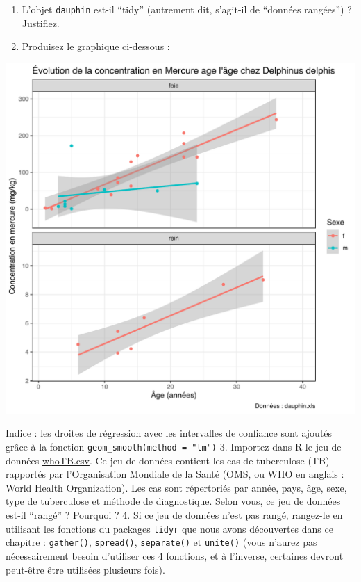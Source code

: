 \documentclass[a4paperpaper,]{article}
\providecommand{\tightlist}{%
  \setlength{\itemsep}{0pt}\setlength{\parskip}{0pt}}
\theoremstyle{definition}
\theoremstyle{definition}
\theoremstyle{definition}
\theoremstyle{remark}
\begin{document}
\begin{enumerate}
\def\labelenumi{\arabic{enumi}.}
\tightlist
\item
  L'objet \texttt{dauphin} est-il ``tidy'' (autrement dit, s'agit-il de
  ``données rangées'') ? Justifiez.
\item
  Produisez le graphique ci-dessous :
\end{enumerate}

\begin{center}\includegraphics[width=0.9\linewidth]{figure/exercicedauphin-1} \end{center}

Indice : les droites de régression avec les intervalles de confiance
sont ajoutés grâce à la fonction \texttt{geom\_smooth(method\ =\ "lm")}
3. Importez dans R le jeu de données \href{data/whoTB.csv}{whoTB.csv}.
Ce jeu de données contient les cas de tuberculose (TB) rapportés par
l'Organisation Mondiale de la Santé (OMS, ou WHO en anglais : World
Health Organization). Les cas sont répertoriés par année, pays, âge,
sexe, type de tuberculose et méthode de diagnostique. Selon vous, ce jeu
de données est-il ``rangé'' ? Pourquoi ? 4. Si ce jeu de données n'est
pas rangé, rangez-le en utilisant les fonctions du packages
\texttt{tidyr} que nous avons découvertes dans ce chapitre :
\texttt{gather()}, \texttt{spread()}, \texttt{separate()} et
\texttt{unite()} (vous n'aurez pas nécessairement besoin d'utiliser ces
4 fonctions, et à l'inverse, certaines devront peut-être être utilisées
plusieurs fois).
\end{document}
